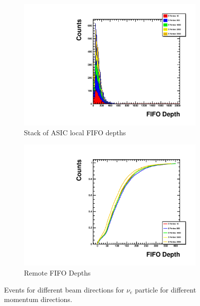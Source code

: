 \begin{figure}
\centering
\begin{subfigure}{.5\textwidth}
  \centering
  \includegraphics[width=\textwidth]{images/Const_Theta0_ASIC_stack_integral_pdg12_fhc.pdf}
  \caption{Stack of ASIC local FIFO depths}
\end{subfigure}%
\begin{subfigure}{.5\textwidth}
  \centering
  \includegraphics[width=\textwidth]{images/Const_Theta0_ASIC_integral_pdg12_fhc.pdf}
  \caption{Remote FIFO Depths}
\end{subfigure}
\caption{Events for different beam directions for $\nu_{e}$ particle for different momentum directions.}
\label{fig:example_asic_integral_value_constTheta}
\end{figure}


